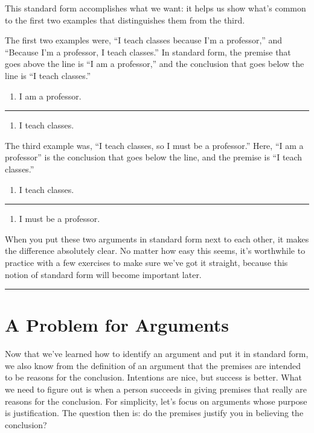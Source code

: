\documentclass[12pt]{article}
\newcommand{\separator}{\noindent\rule{\linewidth}{1pt}}
\begin{document}
This standard form accomplishes what we want: it helps us show what's common to the first two examples that distinguishes them from the third.

The first two examples were, ``I teach classes because I'm a professor,'' and ``Because I'm a professor, I teach classes.'' In standard form, the premise that goes above the line is ``I am a professor,'' and the conclusion that goes below the line is ``I teach classes.''

\begin{tcolorbox}
    \begin{enumerate}[label=(\arabic*)]
        \item I am a professor.
    \end{enumerate}
    \separator
    \begin{enumerate}[label=$\therefore$ (\arabic*), start=2]
        \item I teach classes.
    \end{enumerate}
\end{tcolorbox}

The third example was, ``I teach classes, so I must be a professor.'' Here, ``I am a professor'' is the conclusion that goes below the line, and the premise is ``I teach classes.''

\begin{tcolorbox}
    \begin{enumerate}[label=(\arabic*)]
        \item I teach classes.
    \end{enumerate}
    \separator
    \begin{enumerate}[label=$\therefore$ (\arabic*), start=2]
        \item I must be a professor.
    \end{enumerate}
\end{tcolorbox}

When you put these two arguments in standard form next to each other, it makes the difference absolutely clear. No matter how easy this seems, it's worthwhile to practice with a few exercises to make sure we've got it straight, because this notion of standard form will become important later.

\separator

\section{A Problem for Arguments}
Now that we've learned how to identify an argument and put it in standard form, we also know from the definition of an argument that the premises are intended to be reasons for the conclusion. Intentions are nice, but success is better. What we need to figure out is when a person succeeds in giving premises that really are reasons for the conclusion. For simplicity, let's focus on arguments whose purpose is justification. The question then is: do the premises justify you in believing the conclusion?
\end{document}
